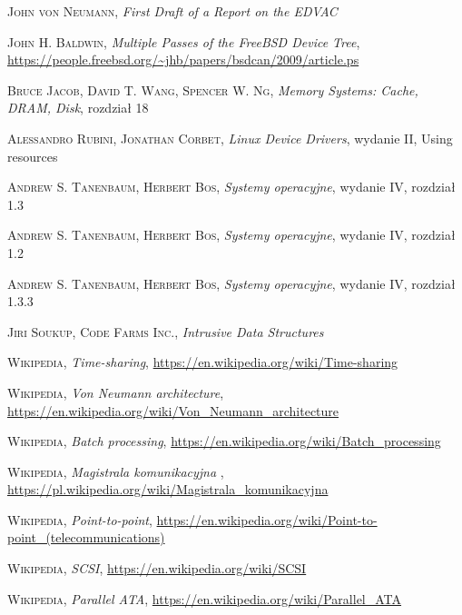 \documentclass[shortabstract,inz]{iithesis}
\begin{document}
\begin{thebibliography}{1}


 \textsc{John von Neumann}, 
\textit{First Draft of a Report on the EDVAC}

 \textsc{John H. Baldwin}, 
\textit{Multiple Passes of the FreeBSD Device Tree},
\url{https://people.freebsd.org/~jhb/papers/bsdcan/2009/article.ps}

 \textsc{Bruce Jacob, David T. Wang, Spencer W. Ng},
\textit{Memory Systems: Cache, DRAM, Disk}, rozdział 18

 \textsc{Alessandro Rubini, Jonathan Corbet},
\textit{Linux Device Drivers}, wydanie II, Using resources

 \textsc{Andrew S. Tanenbaum, Herbert Bos},
\textit{Systemy operacyjne}, wydanie IV, rozdział 1.3

 \textsc{Andrew S. Tanenbaum, Herbert Bos},
\textit{Systemy operacyjne}, wydanie IV, rozdział 1.2

 \textsc{Andrew S. Tanenbaum, Herbert Bos},
\textit{Systemy operacyjne}, wydanie IV, rozdział 1.3.3

 \textsc{Jiri Soukup, Code Farms Inc.}, 
\textit{Intrusive Data Structures}

 \textsc{Wikipedia}, \textit{Time-sharing},
\url{https://en.wikipedia.org/wiki/Time-sharing}

 \textsc{Wikipedia}, \textit{Von Neumann architecture},
\url{https://en.wikipedia.org/wiki/Von_Neumann_architecture}

 \textsc{Wikipedia}, \textit{Batch processing},
\url{https://en.wikipedia.org/wiki/Batch_processing}

 \textsc{Wikipedia}, \textit{Magistrala komunikacyjna} ,
\url{https://pl.wikipedia.org/wiki/Magistrala_komunikacyjna}

 \textsc{Wikipedia}, \textit{Point-to-point},
\url{https://en.wikipedia.org/wiki/Point-to-point_(telecommunications)}

 \textsc{Wikipedia}, \textit{SCSI},
\url{https://en.wikipedia.org/wiki/SCSI}

 \textsc{Wikipedia}, \textit{Parallel ATA},
\url{https://en.wikipedia.org/wiki/Parallel_ATA}


\end{thebibliography}
\end{document}
